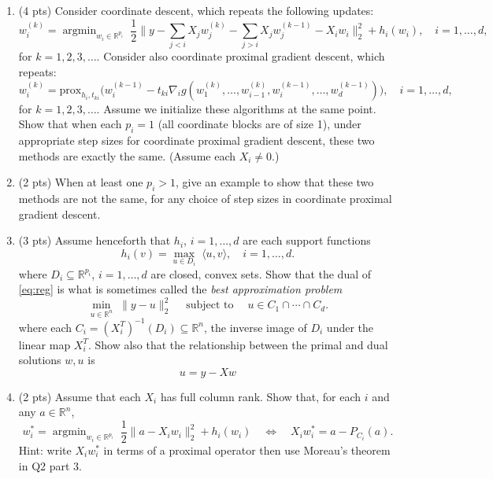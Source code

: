 \documentclass{article}
\theoremstyle{remark}
\theoremstyle{definition}
\newcommand{\argmin}{\mathop{\mathrm{argmin}}}
\newcommand{\st}{\mathop{\mathrm{subject\,\,to}}}
\def\R{\mathbb{R}}
\def\prox{\mathrm{prox}}
\begin{document}
\begin{enumerate}

\item (4 pts) Consider coordinate descent, which repeats the following updates: 
  \begin{equation}
    \label{eq:cd}
  w_i^{(k)} = \argmin_{w_i \in \R^{p_i}} \; \frac{1}{2} \bigg\| y - \sum_{j<i}
  X_j w_j^{(k)} - \sum_{j>i} X_j w_j^{(k-1)} - X_iw_i \bigg\|_2^2 + h_i(w_i),
  \quad i=1,\ldots,d, 
  \end{equation}
  for $k=1,2,3,\ldots$.  Consider also coordinate proximal gradient descent,
  which repeats:
  \begin{equation}
    \label{eq:cgd}
  w_i^{(k)} = \prox_{h_i,t_{ki}} \Big( w_i^{(k-1)} - 
  t_{ki} \nabla_i g(w_1^{(k)},\ldots,w_{i-1}^{(k)},w_i^{(k-1)},\ldots,w_d^{(k-1)})
  \Big), \quad i=1,\ldots,d, 
  \end{equation}
  for $k=1,2,3,\ldots$.  Assume we initialize these algorithms at the same
  point.  Show that when each $p_i=1$ (all coordinate blocks are of size 1),
  under appropriate step sizes for coordinate proximal gradient descent, these
  two methods are exactly the same. (Assume each $X_i\neq 0$.)

\item (2 pts) When at least one $p_i>1$, give an example to show that these two
  methods are not the same, for any choice of step sizes in coordinate proximal
  gradient descent. 

\item (3 pts) Assume henceforth that $h_i$, $i=1,\ldots,d$ are each support
  functions 
  $$
  h_i(v) =\max_{u \in D_i} \; \langle u,v \rangle, \quad i=1,\ldots,d.   
  $$
  where $D_i \subseteq \R^{p_i}$, $i=1,\dots,d$ are closed, convex sets.
  Show that the dual of \eqref{eq:reg} is what is sometimes called the {\it best
    approximation problem}
  \begin{equation}
    \label{eq:bap}
    \min_{u \in \R^n} \; \|y-u\|_2^2 
    \quad \st \quad u \in C_1 \cap \cdots \cap C_d.
  \end{equation}
  where each $C_i = (X_i^T)^{-1}(D_i) \subseteq \R^n$, the inverse image of
  $D_i$ under the linear map $X_i^T$.  Show also that the relationship between
  the primal and dual solutions $w,u$ is 
  \begin{equation}
    \label{eq:prim_dual}
    u = y - Xw
  \end{equation}

\item (2 pts) Assume that each $X_i$ has full column rank. Show that,
  for each $i$ and any $a \in \R^n$,
  $$
  w^*_i = \argmin_{w_i \in \R^{p_i}} \; \frac{1}{2} \| a - X_iw_i \|_2^2 
  + h_i(w_i) 
  \quad \iff \quad 
  X_iw^*_i = a - P_{C_i}(a).
  $$
  Hint: write $X_iw_i^*$ in terms of a proximal operator then use Moreau's
  theorem in Q2 part 3.  


\end{enumerate}
\end{document}
